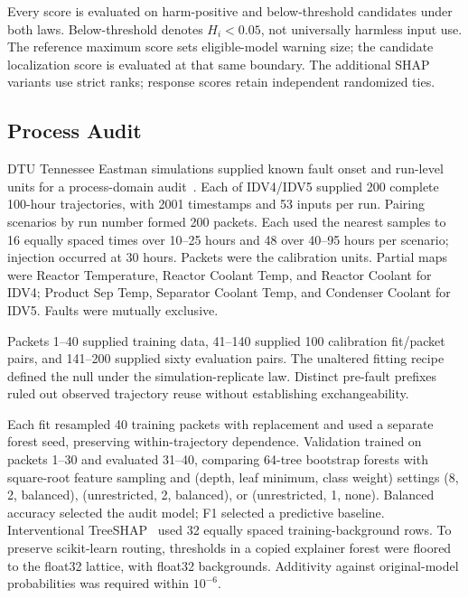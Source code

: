 \documentclass[conference]{IEEEtran}
\begin{document}
Every score is evaluated on harm-positive and below-threshold candidates under both laws. Below-threshold denotes $H_i<0.05$, not universally harmless input use. The reference maximum score sets eligible-model warning size; the candidate localization score is evaluated at that same boundary. The additional SHAP variants use strict ranks; response scores retain independent randomized ties.

\subsection{Process Audit}
DTU Tennessee Eastman simulations supplied known fault onset and run-level units for a process-domain audit~\cite{reinartz2021tep,reinartz2021data}. Each of IDV4/IDV5 supplied 200 complete 100-hour trajectories, with 2001 timestamps and 53 inputs per run. Pairing scenarios by run number formed 200 packets. Each used the nearest samples to 16 equally spaced times over 10--25 hours and 48 over 40--95 hours per scenario; injection occurred at 30 hours. Packets were the calibration units. Partial maps were Reactor Temperature, Reactor Coolant Temp, and Reactor Coolant for IDV4; Product Sep Temp, Separator Coolant Temp, and Condenser Coolant for IDV5. Faults were mutually exclusive.

Packets 1--40 supplied training data, 41--140 supplied 100 calibration fit/packet pairs, and 141--200 supplied sixty evaluation pairs. The unaltered fitting recipe defined the null under the simulation-replicate law. Distinct pre-fault prefixes ruled out observed trajectory reuse without establishing exchangeability.

Each fit resampled 40 training packets with replacement and used a separate forest seed, preserving within-trajectory dependence. Validation trained on packets 1--30 and evaluated 31--40, comparing 64-tree bootstrap forests with square-root feature sampling and (depth, leaf minimum, class weight) settings (8, 2, balanced), (unrestricted, 2, balanced), or (unrestricted, 1, none). Balanced accuracy selected the audit model; F1 selected a predictive baseline. Interventional TreeSHAP~\cite{lundberg2020trees} used 32 equally spaced training-background rows. To preserve scikit-learn routing, thresholds in a copied explainer forest were floored to the float32 lattice, with float32 backgrounds. Additivity against original-model probabilities was required within $10^{-6}$.
\end{document}

